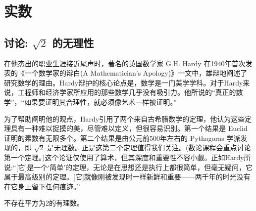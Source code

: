 \chapter{实数}
\label{chap:1}
\section{讨论: \(\sqrt{2}\) 的无理性}
\label{sec:1.1}
在他杰出的职业生涯接近尾声时，著名的英国数学家 G.H. Hardy 在1940年首次发表的《一个数学家的辩白(A Mathematician’s Apology)》一文中，雄辩地阐述了研究数学的理由。Hardy辩护的核心论点是，数学是一门美学学科。对于Hardy来说，工程师和经济学家所应用的那些数学几乎没有吸引力。他所说的“真正的数学”，“如果要证明其合理性，就必须像艺术一样被证明。”

为了帮助阐明他的观点，Hardy引用了两个来自古希腊数学的定理，他认为这些定理具有一种难以捉摸的美，尽管难以定义，但很容易识别。第一个结果是 Euclid 证明的素数有无限多个。第二个结果是由公元前500年左右的 Pythagoras 学派发现的，即 \(\sqrt{2}\) 是无理数。正是这第二个定理值得我们关注。(数论课程会重点讨论第一个定理。)这个论证仅使用了算术，但其深度和重要性不容小觑。正如Hardy所说:“[它]是一个‘简单’的定理，无论是在思想还是执行上都很简单，但毫无疑问，它属于最高级别的定理。[它]就像刚被发现时一样新鲜和重要——两千年的时光没有在它身上留下任何痕迹。”

\begin{Thm}
  \label{thm:1.1.1}
  不存在平方为2的有理数。
\end{Thm}

